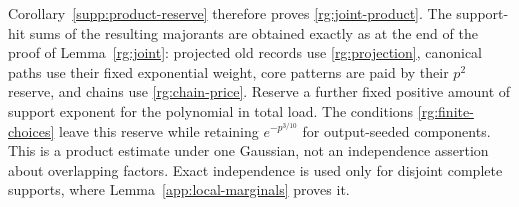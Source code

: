 Corollary~\ref{supp:product-reserve} therefore proves
\eqref{rg:joint-product}. The support-hit sums of the resulting
majorants are obtained exactly as at the end of the proof of
Lemma~\ref{rg:joint}: projected old records use
\eqref{rg:projection}, canonical paths use their fixed exponential
weight, core patterns are paid by their $p^2$ reserve, and chains use
\eqref{rg:chain-price}. Reserve a further fixed positive amount of
support exponent for the polynomial in total load. The conditions
\eqref{rg:finite-choices} leave this reserve while retaining
$e^{-p^{3/10}}$ for output-seeded components. This is a product estimate
under one Gaussian, not an independence assertion about overlapping
factors. Exact independence is used only for disjoint complete supports,
where Lemma~\ref{app:local-marginals} proves it.
